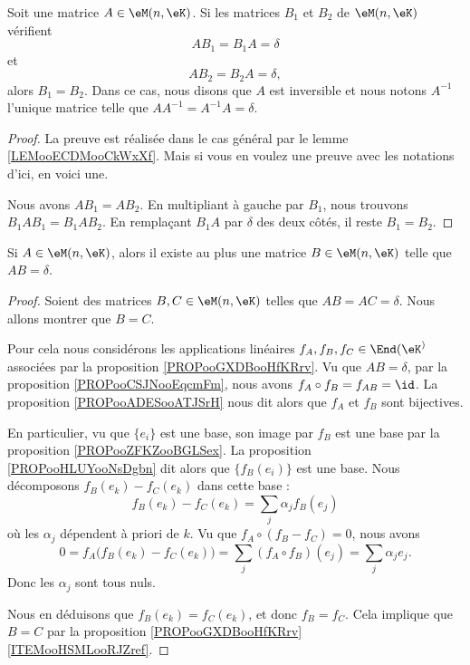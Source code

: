 \begin{propositionDef}      \label{PROPooMLWRooRWfZXE}
    Soit une matrice \( A\in \eM(n,\eK)\). Si les matrices \( B_1\) et \( B_2\) de \( \eM(n,\eK)\) vérifient
    \begin{equation}
        AB_1=B_1A=\delta
    \end{equation}
    et
    \begin{equation}
        AB_2=B_2A=\delta,
    \end{equation}
    alors \( B_1=B_2\). Dans ce cas, nous disons que \( A\) est inversible et nous notons \( A^{-1}\) l'unique matrice telle que \( AA^{-1}=A^{-1}A=\delta\).
\end{propositionDef}

\begin{proof}
    La preuve est réalisée dans le cas général par le lemme \ref{LEMooECDMooCkWxXf}. Mais si vous en voulez une preuve avec les notations d'ici, en voici une.

    Nous avons $AB_1=AB_2$. En multipliant à gauche par \( B_1\), nous trouvons \( B_1AB_1=B_1AB_2\). En remplaçant \( B_1A\) par \( \delta\) des deux côtés, il reste \( B_1=B_2\).
\end{proof}

\begin{lemma}        \label{LEMooGZCTooQigDvC}
    Si \( A\in \eM(n,\eK)\), alors il existe au plus une matrice \( B\in \eM(n,\eK)\) telle que \( AB=\delta\).
\end{lemma}

\begin{proof}
    Soient des matrices \( B,C\in \eM(n,\eK)\) telles que \( AB=AC=\delta\). Nous allons montrer que \( B=C\).

    Pour cela nous considérons les applications linéaires \( f_A, f_B, f_C\in \End(\eK^)\) associées par la proposition \ref{PROPooGXDBooHfKRrv}. Vu que \( AB=\delta\), par la proposition \ref{PROPooCSJNooEqcmFm}, nous avons \( f_A\circ f_B = f_{AB}=\id\). La proposition \ref{PROPooADESooATJSrH} nous dit alors que \( f_A\) et \( f_B\) sont bijectives. 

    En particulier, vu que \( \{e_i\}\) est une base, son image par \( f_B\) est une base par la proposition \ref{PROPooZFKZooBGLSex}. La proposition \ref{PROPooHLUYooNsDgbn} dit alors que \( \{f_B(e_i)\}\) est une base. Nous décomposons \( f_B(e_k)-f_C(e_k)\) dans cette base :
    \begin{equation}
        f_B(e_k)-f_C(e_k)=\sum_j\alpha_jf_B(e_j)
    \end{equation}
    où les \( \alpha_j\) dépendent à priori de \( k\). Vu que \( f_A\circ(f_B-f_C)=0\), nous avons 
    \begin{equation}
        0=f_A\big( f_B(e_k)-f_C(e_k) \big)=\sum_j(f_A\circ f_B)(e_j)=\sum_j\alpha_je_j.
    \end{equation}
    Donc les \( \alpha_j\) sont tous nuls.

    Nous en déduisons que \( f_B(e_k)=f_C(e_k)\), et donc \( f_B=f_C\). Cela implique que \( B=C\) par la proposition \ref{PROPooGXDBooHfKRrv}\ref{ITEMooHSMLooRJZref}.
\end{proof}

